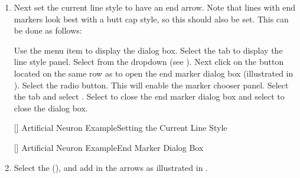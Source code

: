 \begin{enumerate}
Make sure that the \gls{controlpt} is selected before you start to
drag it with the mouse or you may end up moving the wrong \gls{controlpt}.
If you have enabled the \gridlock, you may find it easier to disable
it while you are editing the curvature \glspl{controlpt}. If you
have trouble selecting a \gls{controlpt}, try cycling round with
. Alternatively, use the
 dialog, which can be opened with
.

[]
{
  {fig:neuron3a}{}{},
  {fig:neuron3b}{}{}
}
[Artificial Neuron Example\dash Creating a Sigmoidal Curve]
{Artificial Neuron Example\dash creating a sigmoidal
curve:
 adding an open curve segment;
 edit segment to adjust curvature.}

\item Next set the current line style to have an end
arrow. Note that lines with end markers look best with a butt cap
style, so this should also be set. This can be done as follows:

Use the  menu item to display the
 dialog box. Select the  tab
to display the line style panel.  Select 
from the  \gls*{dropdown} (see
).  Next click on the 
button located on the same row as  to
open the end marker dialog box (illustrated in
). Select the
 radio button. This will enable the marker
chooser panel. Select the  tab and select
. Select  to close the end marker
dialog box and select  to close the 
dialog box.

[]
{}
{Artificial Neuron Example\dash Setting the Current Line Style}

[]
{}
{Artificial Neuron Example\dash End Marker Dialog Box}

\item Select the  (), and
add in the arrows as illustrated in .


\end{enumerate}
